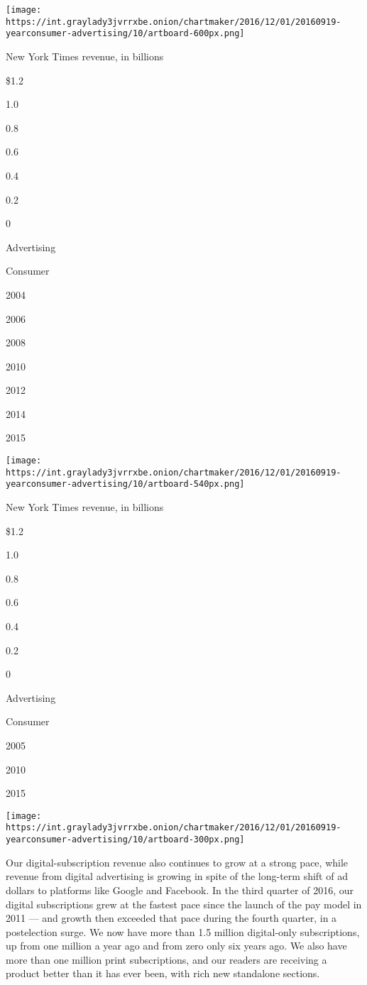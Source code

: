 \texttt{[image: https://int.graylady3jvrrxbe.onion/chartmaker/2016/12/01/20160919-yearconsumer-advertising/10/artboard-600px.png]}

New York Times revenue, in billions

\$1.2

1.0

0.8

0.6

0.4

0.2

0

Advertising

Consumer

2004

2006

2008

2010

2012

2014

2015

\texttt{[image: https://int.graylady3jvrrxbe.onion/chartmaker/2016/12/01/20160919-yearconsumer-advertising/10/artboard-540px.png]}

New York Times revenue, in billions

\$1.2

1.0

0.8

0.6

0.4

0.2

0

Advertising

Consumer

2005

2010

2015

\texttt{[image: https://int.graylady3jvrrxbe.onion/chartmaker/2016/12/01/20160919-yearconsumer-advertising/10/artboard-300px.png]}

Our digital-subscription revenue also continues to grow at a strong
pace, while revenue from digital advertising is growing in spite of the
long-term shift of ad dollars to platforms like Google and Facebook. In
the third quarter of 2016, our digital subscriptions grew at the fastest
pace since the launch of the pay model in 2011 --- and growth then
exceeded that pace during the fourth quarter, in a postelection surge.
We now have more than 1.5 million digital-only subscriptions, up from
one million a year ago and from zero only six years ago. We also have
more than one million print subscriptions, and our readers are receiving
a product better than it has ever been, with rich new standalone
sections.


